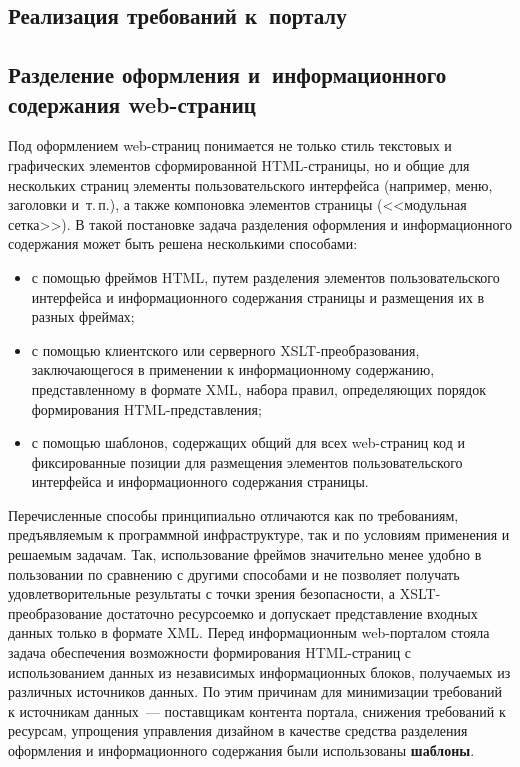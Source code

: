\begin{multicols}{2}
\section{Реализация требований к~порталу}

\subsection{Разделение оформления и~информационного содержания
web-страниц}

 Под оформлением web-страниц понимается не только стиль текстовых и
графических элементов сформированной HTML-страницы, но и общие для нескольких
страниц элементы пользовательского интерфейса (например, меню, заголовки и~т.\,п.), а
также компоновка элементов страницы (<<модульная сетка>>). В такой постановке задача
разделения оформления и информационного содержания может быть решена несколькими
способами:
 \begin{itemize}
\item с помощью фреймов HTML, путем разделения элементов пользовательского
интерфейса и информационного содержания страницы и размещения их в разных
фреймах;
\item с помощью клиентского или серверного XSLT-преобразования,
заключающегося в применении к информационному содержанию,
представленному в формате XML, набора правил, определяющих порядок
формирования HTML-представления;
\item с помощью шаблонов, содержащих общий для всех web-страниц код и
фиксированные позиции для размещения элементов пользовательского интерфейса
и информационного содержания страницы.
\end{itemize}

 Перечисленные способы принципиально отличаются как по требованиям,
предъявляемым к программной инфраструктуре, так и по условиям применения и
решаемым задачам. Так, использование фреймов значительно менее удобно в пользовании
по сравнению с другими способами и не позволяет получать удовлетворительные
результаты с точки зрения безопасности, а XSLT-преобразование достаточно ресурсоемко
и допускает представление входных данных только в формате XML. Перед
информационным web-порталом стояла задача обеспечения возможности формирования
HTML-страниц с использованием данных из независимых информационных блоков,
получаемых из различных источников данных. По этим причинам для минимизации
требований к источникам данных~--- поставщикам контента портала, снижения
требований к ресурсам, упрощения управления дизайном в качестве средства разделения
оформления и информационного содержания были использованы \textbf{шаблоны}.



\end{multicols}
